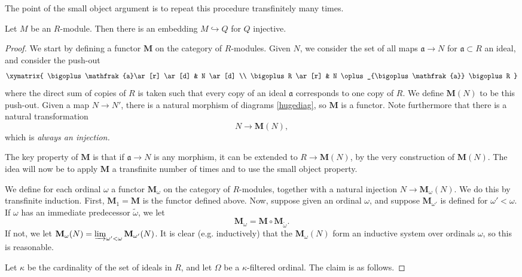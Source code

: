 The point of the small object argument is to repeat this procedure
transfinitely many times.

\begin{theorem} 
Let $M$ be an $R$-module. Then there is an embedding $M \hookrightarrow Q$ for
$Q$ injective.
\end{theorem} 
\begin{proof} 
We start by defining a functor $\mathbf{M}$ on the category of $R$-modules.
Given $N$, we consider the set of all maps $\mathfrak{a} \to N$ for
$\mathfrak{a} \subset R$ an ideal, and consider the  push-out
\begin{equation} \label{hugediag}
\xymatrix{
\bigoplus \mathfrak{a}\ar[r] \ar[d]  & N \ar[d] \\
\bigoplus R \ar[r] &  N \oplus_{\bigoplus \mathfrak{a}} \bigoplus R
}
\end{equation}
where the direct sum of copies of $R$ is taken such that every copy of an
ideal $\mathfrak{a}$ corresponds to one copy of $R$.
We define $\mathbf{M}(N)$ to be this push-out. Given a map $N \to N'$, there
is a natural morphism of diagrams \cref{hugediag}, so $\mathbf{M}$ is a
functor.
Note furthermore that there is a natural transformation
\[ N \to \mathbf{M}(N),  \]
which is \emph{always an injection.}

The key property of $\mathbf{M}$ is that if $\mathfrak{a} \to N$ is any
morphism, it can be extended to $R \to \mathbf{M}(N)$, by the very
construction of $\mathbf{M}(N)$. The idea will now be to
apply $\mathbf{M}$ a transfinite number of times and to use the small object
property. 


We define for each ordinal $\omega$ a functor $\mathbf{M}_{\omega}$ on the
category of $R$-modules, together with a natural injection $N \to
\mathbf{M}_{\omega}(N)$. We do this by transfinite induction. 
First, $\mathbf{M}_1 = \mathbf{M}$ is the functor defined above.
Now, suppose given an ordinal $\omega$, and suppose $\mathbf{M}_{\omega'}$ is
defined for $\omega' < \omega$. If $\omega$ has an immediate predecessor
$\widetilde{\omega}$, we let
$$\mathbf{M}_{\omega} = \mathbf{M} \circ \mathbf{M}_{\widetilde{\omega}}.$$
If not, we let $\mathbf{M}_{\omega}(N) = \varinjlim_{\omega' < \omega}
\mathbf{M}_{\omega'}(N)$. 
It is clear (e.g. inductively) that the $\mathbf{M}_{\omega}(N)$ form an inductive system over
ordinals $\omega$, so this is reasonable. 

Let $\kappa$ be the cardinality of the set of ideals in $R$, and let $\Omega$
be a $\kappa$-filtered ordinal.
The claim is as follows.


\end{proof}
